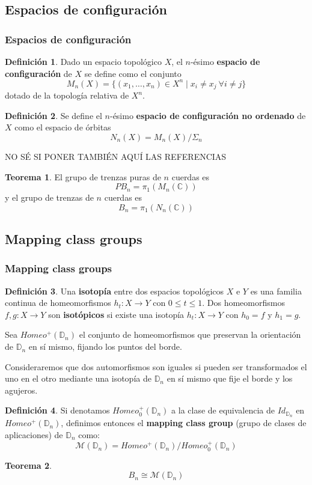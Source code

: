 \documentclass{beamer}
\theoremstyle{definition}
\newtheorem{teorema}{Teorema}
\newtheorem{defi}{Definición}
\newcommand{\C}{\mathbb{C}}
\newcommand{\D}{\mathbb{D}}
\begin{document}
\subsection{Espacios de configuración}

\begin{frame}
\frametitle{Espacios de configuración}
\begin{defi}
Dado un espacio topológico $X$, el $n$-ésimo \textbf{espacio de configuración} de $X$ se define como el conjunto
$$M_n(X)=\{(x_1,\dots,x_n)\in X^n\mid x_i\neq x_j\ \forall i\neq j\}$$
dotado de la topología relativa de $X^n$.
\end{defi}
\begin{defi}
Se define el $n$-ésimo \textbf{espacio de configuración no ordenado} de $X$ como el espacio de órbitas
$$N_n(X)=M_n(X)/\Sigma_n$$
\end{defi}
\end{frame}

\begin{frame}
NO SÉ SI PONER TAMBIÉN AQUÍ LAS REFERENCIAS 
\begin{teorema}
El grupo de trenzas puras de $n$ cuerdas es
$$PB_n=\pi_1(M_n(\C))$$
y el grupo de trenzas de $n$ cuerdas es
$$B_n=\pi_1(N_n(\C))$$
\end{teorema}
\end{frame}

\subsection{Mapping class groups}

\begin{frame}
\frametitle{Mapping class groups}
\begin{defi}
Una \textbf{isotopía} entre dos espacios topológicos $X$ e $Y$ es una familia continua de homeomorfismos $h_t:X\to Y$ con $0\leq t\leq 1$. Dos homeomorfismos $f,g:X\to Y$ son \textbf{isotópicos} si existe una isotopía $h_t:X\to Y$ con $h_0=f$ y $h_1=g$. 
\end{defi}
Sea $Homeo^+(\D_n)$ el conjunto de homeomorfismos que preservan la orientación de $\D_n$ en sí mismo, fijando los puntos del borde. 
\end{frame}


\begin{frame}
Consideraremos que dos automorfismos son iguales si pueden ser transformados el uno en el otro mediante una isotopía de $\D_n$ en sí mismo que fije el borde y los agujeros.
\begin{defi} Si denotamos $Homeo^+_0(\D_n)$ a la clase de equivalencia de $Id_{\D_n}$ en $Homeo^+(\D_n)$, definimos entonces el \textbf{mapping class group} (grupo de clases de aplicaciones) de $\D_n$ como:
$$\mathcal{M}(\D_n)=Homeo^+(\D_n)/Homeo^+_0(\D_n)$$
\end{defi}
\begin{teorema}
$$B_n\cong \mathcal{M}(\D_n)$$
\end{teorema}
\end{frame}
\end{document}
